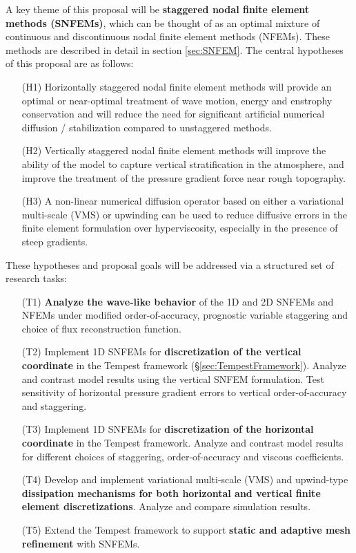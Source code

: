 \documentclass[11pt]{article}
\begin{document}
\vspace{-0.4cm}
A key theme of this proposal will be \textbf{staggered nodal finite element methods (SNFEMs)}, which can be thought of as an optimal mixture of continuous and discontinuous nodal finite element methods (NFEMs).  These methods are described in detail in section \ref{sec:SNFEM}.  The central hypotheses of this proposal are as follows:

\vspace{-0.4cm}
\begin{itemize}
\item[(H1)] Horizontally staggered nodal finite element methods will provide an optimal or near-optimal treatment of wave motion, energy and enstrophy conservation and will reduce the need for significant artificial numerical diffusion / stabilization compared to unstaggered methods.

\item[(H2)] Vertically staggered nodal finite element methods will improve the ability of the model to capture vertical stratification in the atmosphere, and improve the treatment of the pressure gradient force near rough topography.

\item[(H3)] A non-linear numerical diffusion operator based on either a variational multi-scale (VMS) or upwinding can be used to reduce diffusive errors in the finite element formulation over hyperviscosity, especially in the presence of steep gradients.
\end{itemize}

These hypotheses and proposal goals will be addressed via a structured set of research tasks:

\vspace{-0.4cm}
\begin{itemize}
\item[(T1)] \textbf{Analyze the wave-like behavior} of the 1D and 2D SNFEMs and NFEMs under modified order-of-accuracy, prognostic variable staggering and choice of flux reconstruction function.

\item[(T2)] Implement 1D SNFEMs for \textbf{discretization of the vertical coordinate} in the Tempest framework (\S \ref{sec:TempestFramework}).  Analyze and contrast model results using the vertical SNFEM formulation.  Test sensitivity of horizontal pressure gradient errors to vertical order-of-accuracy and staggering.

\item[(T3)] Implement 1D SNFEMs for \textbf{discretization of the horizontal coordinate} in the Tempest framework.  Analyze and contrast model results for different choices of staggering, order-of-accuracy and viscous coefficients.

\item[(T4)] Develop and implement variational multi-scale (VMS) and upwind-type \textbf{dissipation mechanisms for both horizontal and vertical finite element discretizations}.  Analyze and compare simulation results.

\item[(T5)] Extend the Tempest framework to support \textbf{static and adaptive mesh refinement} with SNFEMs.
\end{itemize}
\end{document}
